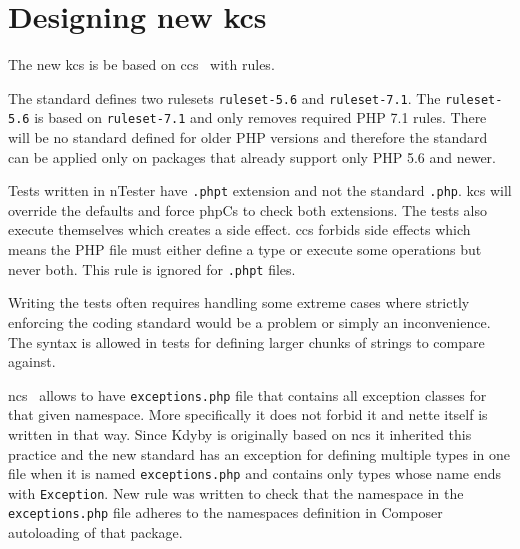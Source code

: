 \section{Designing new \acrlong{kcs}}

The new \gls{kcs} is be based on \gls{ccs}~\cite{consistence:coding-standard} with  rules.

The standard defines two rulesets \lstinline{ruleset-5.6} and \lstinline{ruleset-7.1}. The \lstinline{ruleset-5.6} is based on \lstinline{ruleset-7.1} and only removes required PHP 7.1 rules. There will be no standard defined for older PHP versions and therefore the standard can be applied only on packages that already support only PHP 5.6 and newer.


Tests written in \gls{nTester} have \lstinline{.phpt} extension and not the standard \lstinline{.php}. \gls{kcs} will override the defaults and force \gls{phpCs} to check both extensions. The tests also execute themselves which creates a side effect. \gls{ccs} forbids side effects which means the PHP file must either define a type or execute some operations but never both. This rule is ignored for \lstinline{.phpt} files.

Writing the tests often requires handling some extreme cases where strictly enforcing the coding standard would be a problem or simply an inconvenience. The  syntax is allowed in tests for defining larger chunks of strings to compare against.


\gls{ncs}~\cite{nette:coding-standard} allows to have \lstinline{exceptions.php} file that contains all exception classes for that given namespace. More specifically it does not forbid it and \gls{nette} itself is written in that way. Since Kdyby is originally based on \gls{ncs} it inherited this practice and the new standard has an exception for defining multiple types in one file when it is named \lstinline{exceptions.php} and contains only types whose name ends with \lstinline{Exception}. New rule was written to check that the namespace in the \lstinline{exceptions.php} file adheres to the namespaces definition in Composer autoloading of that package.



